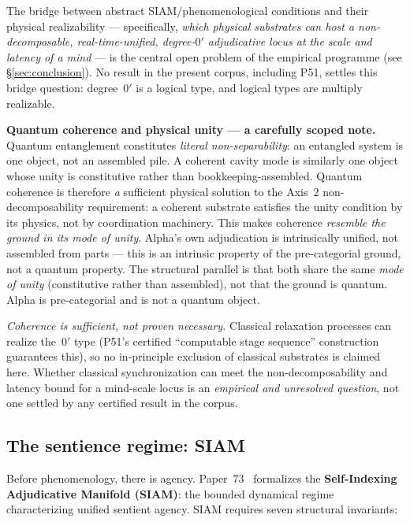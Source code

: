 \documentclass[11pt]{article}
\theoremstyle{remark}
\begin{document}
The bridge between abstract SIAM/phenomenological conditions and their physical
realizability --- specifically, \emph{which physical substrates can host a non-decomposable,
real-time-unified, degree-$0'$ adjudicative locus at the scale and latency of a mind} ---
is the central open problem of the empirical programme (see \S\ref{sec:conclusion}).
No result in the present corpus, including P51, settles this bridge question:
degree~$0'$ is a logical type, and logical types are multiply realizable.

\textbf{Quantum coherence and physical unity --- a carefully scoped note.}
Quantum entanglement constitutes \emph{literal non-separability}: an entangled system
is one object, not an assembled pile. A coherent cavity mode is similarly one object
whose unity is constitutive rather than bookkeeping-assembled.
Quantum coherence is therefore \emph{a} sufficient physical solution to the
Axis~2 non-decomposability requirement: a coherent substrate satisfies the unity
condition by its physics, not by coordination machinery.
This makes coherence \emph{resemble the ground in its mode of unity}. Alpha's own
adjudication is intrinsically unified, not assembled from parts --- this is an intrinsic
property of the pre-categorial ground, not a quantum property. The structural parallel
is that both share the same \emph{mode of unity} (constitutive rather than assembled),
not that the ground is quantum. Alpha is pre-categorial and is not a quantum object.

\emph{Coherence is sufficient, not proven necessary.} Classical relaxation processes
can realize the~$0'$ type (P51's certified ``computable stage sequence'' construction
guarantees this), so no in-principle exclusion of classical substrates is claimed here.
Whether classical synchronization can meet the non-decomposability and latency bound
for a mind-scale locus is an \emph{empirical and unresolved question}, not one settled
by any certified result in the corpus.

\subsection{The sentience regime: SIAM}\label{sec:siam}

Before phenomenology, there is agency. Paper~73~\cite{SpivackNEMS73} formalizes the
\textbf{Self-Indexing Adjudicative Manifold (SIAM)}: the bounded dynamical regime
characterizing unified sentient agency. SIAM requires seven structural invariants:
\end{document}
